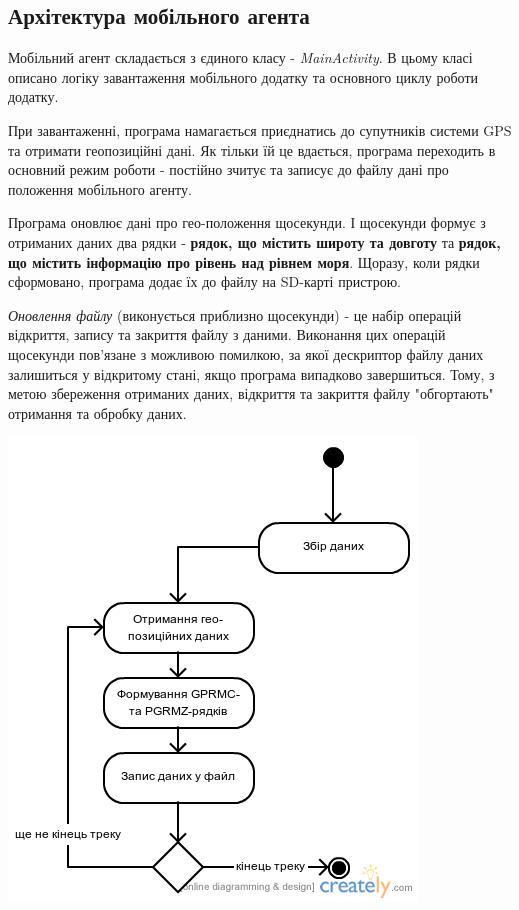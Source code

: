 \documentclass[simple,a4paper,14pt,ukrainian,utf8]{eskdtext}
\begin{document}
	\subsection{Архітектура мобільного агента}
	
	Мобільний агент складається з єдиного класу - \textit{MainActivity}. В цьому класі описано логіку завантаження мобільного додатку та основного циклу роботи додатку.
	
	При завантаженні, програма намагається приєднатись до супутників системи GPS та отримати геопозиційні дані. Як тільки їй це вдається, програма переходить в основний режим роботи - постійно зчитує та записує до файлу дані про положення мобільного агенту.
	
	Програма оновлює дані про гео-положення щосекунди. І щосекунди формує з отриманих даних два рядки - \textbf{рядок, що містить широту та довготу} та \textbf{рядок, що містить інформацію про рівень над рівнем моря}. Щоразу, коли рядки сформовано, програма додає їх до файлу на SD-карті пристрою.
	
	\textit{Оновлення файлу} (виконується приблизно щосекунди) - це набір операцій відкриття, запису та закриття файлу з даними. Виконання цих операцій щосекунди пов’язане з можливою помилкою, за якої дескриптор файлу даних залишиться у відкритому стані, якщо програма випадково завершиться. Тому, з метою збереження отриманих даних, відкриття та закриття файлу "обгортають" отримання та обробку даних.
	
	\vspace{2em}
	\includegraphics[scale=0.5]{images/mobile_agent_workflow.png}
        
\end{document}
